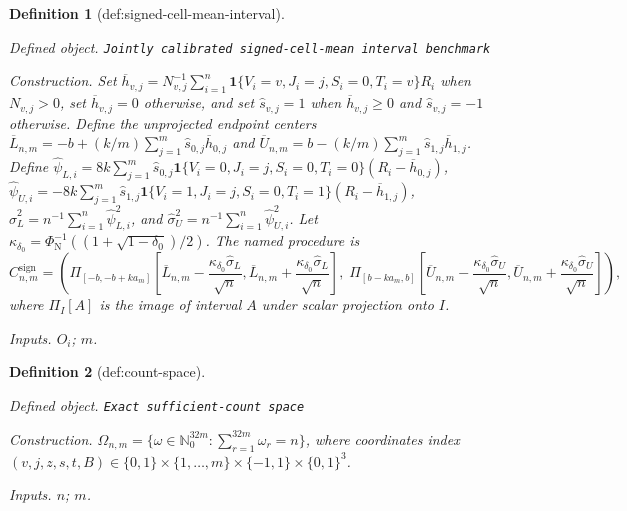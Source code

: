 \documentclass{article}
\newtheorem{definition}{Definition}
\begin{document}
\begin{definition}[def:signed-cell-mean-interval]\label{def:signed-cell-mean-interval}
\par\smallskip\noindent\emph{Defined object.} \texttt{Jointly calibrated signed-\allowbreak{}cell-\allowbreak{}mean interval benchmark}
\par\smallskip\noindent\emph{Construction.} Set \(\overline h_{v,j}=N_{v,j}^{-1}\sum_{i=1}^{n}\mathbf1\{V_i=v,J_i=j,S_i=0,T_i=v\}R_i\) when \(N_{v,j}>0\), set \(\overline h_{v,j}=0\) otherwise, and set \(\widehat s_{v,j}=1\) when \(\overline h_{v,j}\ge0\) and \(\widehat s_{v,j}=-1\) otherwise. Define the unprojected endpoint centers \(\overline L_{n,m}=-b+(k/m)\sum_{j=1}^{m}\widehat s_{0,j}\overline h_{0,j}\) and \(\overline U_{n,m}=b-(k/m)\sum_{j=1}^{m}\widehat s_{1,j}\overline h_{1,j}\). Define \(\widehat\psi_{L,i}=8k\sum_{j=1}^{m}\widehat s_{0,j}\mathbf1\{V_i=0,J_i=j,S_i=0,T_i=0\}(R_i-\overline h_{0,j})\), \(\widehat\psi_{U,i}=-8k\sum_{j=1}^{m}\widehat s_{1,j}\mathbf1\{V_i=1,J_i=j,S_i=0,T_i=1\}(R_i-\overline h_{1,j})\), \(\widehat\sigma_L^2=n^{-1}\sum_{i=1}^{n}\widehat\psi_{L,i}^2\), and \(\widehat\sigma_U^2=n^{-1}\sum_{i=1}^{n}\widehat\psi_{U,i}^2\). Let \(\kappa_{\delta_0}=\Phi_{\mathrm N}^{-1}((1+\sqrt{1-\delta_0})/2)\). The named procedure is \[C^{\mathrm{sign}}_{n,m}=\left(\Pi_{[-b,-b+ka_m]}\left[\overline L_{n,m}\mathbin{-}\frac{\kappa_{\delta_0}\widehat\sigma_L}{\sqrt n},\overline L_{n,m}\mathbin{+}\frac{\kappa_{\delta_0}\widehat\sigma_L}{\sqrt n}\right],\;\Pi_{[b-ka_m,b]}\left[\overline U_{n,m}\mathbin{-}\frac{\kappa_{\delta_0}\widehat\sigma_U}{\sqrt n},\overline U_{n,m}\mathbin{+}\frac{\kappa_{\delta_0}\widehat\sigma_U}{\sqrt n}\right]\right),\] where \(\Pi_I[A]\) is the image of interval \(A\) under scalar projection onto \(I\).
\par\smallskip\noindent\emph{Inputs.} \(O_i\); \(m\).
\end{definition}

\begin{definition}[def:count-space]\label{def:count-space}
\par\smallskip\noindent\emph{Defined object.} \texttt{Exact sufficient-\allowbreak{}count space}
\par\smallskip\noindent\emph{Construction.} \(\Omega_{n,m}=\{\omega\in\mathbb N_0^{32m}:\sum_{r=1}^{32m}\omega_r=n\}\), where coordinates index \((v,j,z,s,t,B)\in\{0,1\}\times\{1,\ldots,m\}\times\{-1,1\}\times\{0,1\}^3\).
\par\smallskip\noindent\emph{Inputs.} \(n\); \(m\).
\end{definition}
\end{document}
